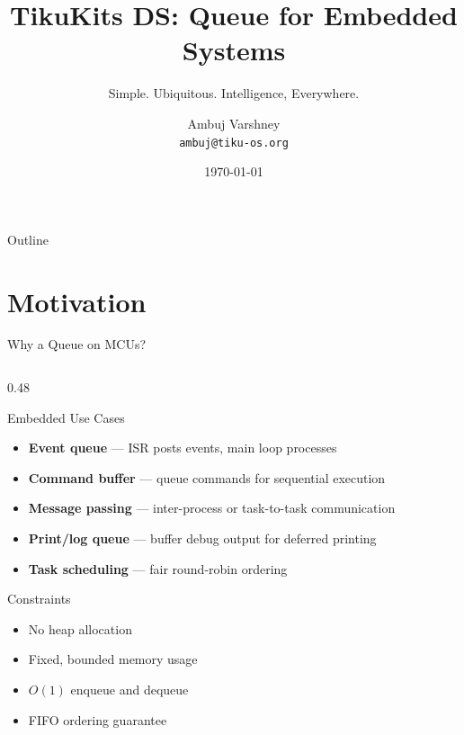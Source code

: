 \documentclass[aspectratio=169, 10pt]{beamer}
\title[TikuKits DS]{TikuKits DS: Queue for Embedded Systems}
\subtitle{Simple. Ubiquitous. Intelligence, Everywhere.}
\author[Ambuj Varshney]{Ambuj Varshney \\ \texttt{ambuj@tiku-os.org}}
\date{\today}
\begin{document}
\begin{frame}
\titlepage
\end{frame}

\begin{frame}{Outline}
\tableofcontents
\end{frame}

\section{Motivation}

\begin{frame}{Why a Queue on MCUs?}
\begin{columns}[T]
\begin{column}{0.48\textwidth}
\begin{block}{Embedded Use Cases}
\begin{itemize}
  \item \textbf{Event queue} --- ISR posts events, main loop processes
  \item \textbf{Command buffer} --- queue commands for sequential execution
  \item \textbf{Message passing} --- inter-process or task-to-task communication
  \item \textbf{Print/log queue} --- buffer debug output for deferred printing
  \item \textbf{Task scheduling} --- fair round-robin ordering
\end{itemize}
\end{block}

\begin{block}{Constraints}
\begin{itemize}
  \item No heap allocation
  \item Fixed, bounded memory usage
  \item $O(1)$ enqueue and dequeue
  \item FIFO ordering guarantee
\end{itemize}
\end{block}
\end{column}


\end{columns}
\end{frame}
\end{document}
